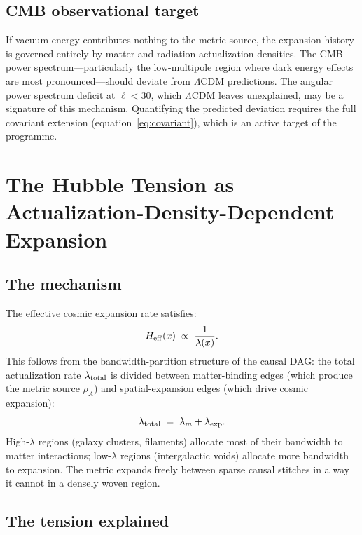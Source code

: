 \documentclass[11pt,twocolumn]{article}
\theoremstyle{plain}
\theoremstyle{remark}
\begin{document}
\subsection{CMB observational target}

If vacuum energy contributes nothing to the metric source, the
expansion history is governed entirely by matter and radiation
actualization densities.
The CMB power spectrum---particularly the low-multipole region
where dark energy effects are most pronounced---should deviate from
$\Lambda$CDM predictions.
The angular power spectrum deficit at $\ell < 30$, which $\Lambda$CDM
leaves unexplained, may be a signature of this mechanism.
Quantifying the predicted deviation requires the full covariant
extension (equation~\eqref{eq:covariant}), which is an active target
of the programme.

\section{The Hubble Tension as Actualization-Density-Dependent Expansion}
\label{sec:hubble}

\subsection{The mechanism}

The effective cosmic expansion rate satisfies:
\begin{equation}
  H_{\rm eff}(x) \;\propto\; \frac{1}{\lambda(x)}.
  \label{eq:Heff}
\end{equation}
This follows from the bandwidth-partition structure of the causal DAG:
the total actualization rate $\lambda_{\rm total}$ is divided between
matter-binding edges (which produce the metric source $\rho_A$) and
spatial-expansion edges (which drive cosmic expansion):
\begin{equation}
  \lambda_{\rm total} \;=\; \lambda_m + \lambda_{\rm exp}.
  \label{eq:partition}
\end{equation}
High-$\lambda$ regions (galaxy clusters, filaments) allocate most
of their bandwidth to matter interactions; low-$\lambda$ regions
(intergalactic voids) allocate more bandwidth to expansion.
The metric expands freely between sparse causal stitches in a way
it cannot in a densely woven region.

\subsection{The tension explained}
\end{document}
